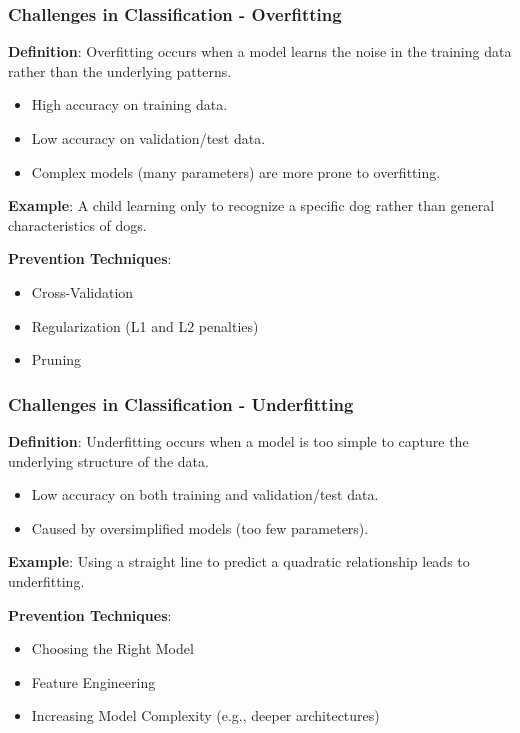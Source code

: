 \documentclass[aspectratio=169]{beamer}
\begin{document}
\begin{frame}[fragile]
    \frametitle{Challenges in Classification - Overfitting}
    \textbf{Definition}: Overfitting occurs when a model learns the noise in the training data rather than the underlying patterns. 
    \begin{itemize}
        \item High accuracy on training data.
        \item Low accuracy on validation/test data.
        \item Complex models (many parameters) are more prone to overfitting.
    \end{itemize}

    \textbf{Example}: A child learning only to recognize a specific dog rather than general characteristics of dogs.

    \textbf{Prevention Techniques}:
    \begin{itemize}
        \item Cross-Validation
        \item Regularization (L1 and L2 penalties)
        \item Pruning
    \end{itemize}
\end{frame}

\begin{frame}[fragile]
    \frametitle{Challenges in Classification - Underfitting}
    \textbf{Definition}: Underfitting occurs when a model is too simple to capture the underlying structure of the data.
    \begin{itemize}
        \item Low accuracy on both training and validation/test data.
        \item Caused by oversimplified models (too few parameters).
    \end{itemize}

    \textbf{Example}: Using a straight line to predict a quadratic relationship leads to underfitting.

    \textbf{Prevention Techniques}:
    \begin{itemize}
        \item Choosing the Right Model
        \item Feature Engineering
        \item Increasing Model Complexity (e.g., deeper architectures)
    \end{itemize}
\end{frame}
\end{document}
